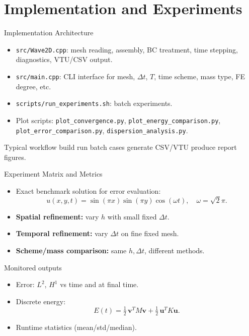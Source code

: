 \documentclass{beamer}
\begin{document}
\section{Implementation and Experiments}

\begin{frame}{Implementation Architecture}
  \begin{itemize}
    \item \texttt{src/Wave2D.cpp}: mesh reading, assembly, BC treatment,
          time stepping, diagnostics, VTU/CSV output.
    \item \texttt{src/main.cpp}: CLI interface for
          mesh, $\Delta t$, $T$, time scheme, mass type, FE degree, etc.
    \item \texttt{scripts/run\_experiments.sh}: batch experiments.
    \item Plot scripts:
      \texttt{plot\_convergence.py},
      \texttt{plot\_energy\_comparison.py},
      \texttt{plot\_error\_comparison.py},
      \texttt{dispersion\_analysis.py}.
  \end{itemize}

  \begin{block}{Typical workflow}
    build \textrightarrow{} run batch cases \textrightarrow{}
    generate CSV/VTU \textrightarrow{} produce report figures.
  \end{block}
\end{frame}

\begin{frame}{Experiment Matrix and Metrics}
  \begin{itemize}
    \item Exact benchmark solution for error evaluation:
      \[
        u(x,y,t)=\sin(\pi x)\sin(\pi y)\cos(\omega t),\quad
        \omega=\sqrt{2}\pi.
      \]
    \item \textbf{Spatial refinement:} vary $h$ with small fixed $\Delta t$.
    \item \textbf{Temporal refinement:} vary $\Delta t$ on fine fixed mesh.
    \item \textbf{Scheme/mass comparison:} same $h,\Delta t$, different methods.
  \end{itemize}

  \begin{block}{Monitored outputs}
    \begin{itemize}
      \item Error: $L^2$, $H^1$ vs time and at final time.
      \item Discrete energy:
        \[
          E(t)=\tfrac12\,\mathbf v^T M\mathbf v
          +\tfrac12\,\mathbf u^T K\mathbf u.
        \]
      \item Runtime statistics (mean/std/median).
    \end{itemize}
  \end{block}
\end{frame}
\end{document}
